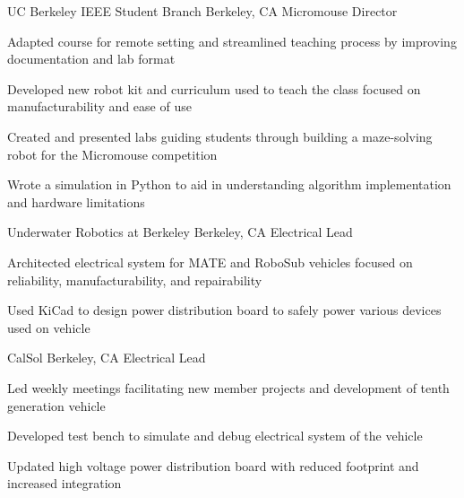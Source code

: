 \documentclass[11pt]{article}
\begin{document}
\sectionloc
{UC Berkeley IEEE Student Branch} {Berkeley, CA}
{Micromouse Director} {}
{\begin{circlist}
	\item Adapted course for remote setting and streamlined teaching process by improving documentation and lab format
	\item Developed new robot kit and curriculum used to teach the class focused on manufacturability and ease of use
\end{circlist}
\begin{circlist}
	\item Created and presented labs guiding students through building a maze-solving robot for the Micromouse competition
	\item Wrote a simulation in Python to aid in understanding algorithm implementation and hardware limitations
\end{circlist}}

\sectionloc
{Underwater Robotics at Berkeley} {Berkeley, CA}
{Electrical Lead} {}
{\begin{circlist}	
	\item Architected electrical system for MATE and RoboSub vehicles focused on reliability, manufacturability, and repairability
\end{circlist}
\begin{circlist}
	\item Used KiCad to design power distribution board to safely power various devices used on vehicle
\end{circlist}}

\sectionloc
{CalSol} {Berkeley, CA}
{Electrical Lead} {}
{\begin{circlist}
	\item Led weekly meetings facilitating new member projects and development of tenth generation vehicle
\end{circlist}
\begin{circlist}
	\item Developed test bench to simulate and debug electrical system of the vehicle
	\item Updated high voltage power distribution board with reduced footprint and increased integration
\end{circlist}}
\end{document}
